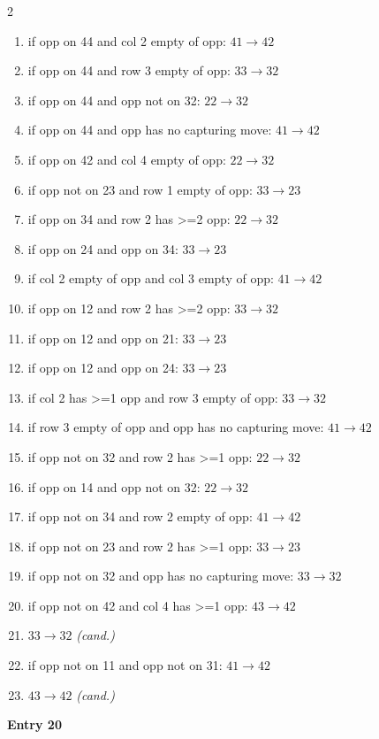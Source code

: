 \begin{multicols}{2}
\begin{tikzpicture}[scale=0.24]
\end{tikzpicture}
\nopagebreak\begin{enumerate}[topsep=1pt,itemsep=0pt,parsep=0pt,leftmargin=2.2em,label=\arabic*.]
\item if opp on 44 and col 2 empty of opp: $41\!\to\!42$
\item if opp on 44 and row 3 empty of opp: $33\!\to\!32$
\item if opp on 44 and opp not on 32: $22\!\to\!32$
\item if opp on 44 and opp has no capturing move: $41\!\to\!42$
\item if opp on 42 and col 4 empty of opp: $22\!\to\!32$
\item if opp not on 23 and row 1 empty of opp: $33\!\to\!23$
\item if opp on 34 and row 2 has >=2 opp: $22\!\to\!32$
\item if opp on 24 and opp on 34: $33\!\to\!23$
\item if col 2 empty of opp and col 3 empty of opp: $41\!\to\!42$
\item if opp on 12 and row 2 has >=2 opp: $33\!\to\!32$
\item if opp on 12 and opp on 21: $33\!\to\!23$
\item if opp on 12 and opp on 24: $33\!\to\!23$
\item if col 2 has >=1 opp and row 3 empty of opp: $33\!\to\!32$
\item if row 3 empty of opp and opp has no capturing move: $41\!\to\!42$
\item if opp not on 32 and row 2 has >=1 opp: $22\!\to\!32$
\item if opp on 14 and opp not on 32: $22\!\to\!32$
\item if opp not on 34 and row 2 empty of opp: $41\!\to\!42$
\item if opp not on 23 and row 2 has >=1 opp: $33\!\to\!23$
\item if opp not on 32 and opp has no capturing move: $33\!\to\!32$
\item if opp not on 42 and col 4 has >=1 opp: $43\!\to\!42$
\item $33\!\to\!32$ \hfill\textit{(cand.)}
\item if opp not on 11 and opp not on 31: $41\!\to\!42$
\item $43\!\to\!42$ \hfill\textit{(cand.)}
\end{enumerate}\smallskip
\noindent\textbf{Entry 20} \; 
\end{multicols}
